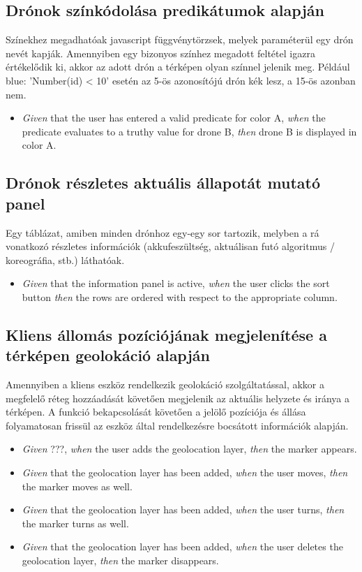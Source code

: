\subsection{Drónok színkódolása predikátumok alapján}

Színekhez megadhatóak javascript függvénytörzsek, melyek paraméterül egy drón nevét kapják.
Amennyiben egy bizonyos színhez megadott feltétel igazra értékelődik ki, akkor az adott drón a térképen olyan színnel jelenik meg.
Például blue: 'Number(id) < 10' esetén az 5-ös azonosítójú drón kék lesz, a 15-ös azonban nem.

\begin {itemize}
  \item \textit{Given} that the user has entered a valid predicate for color A, \textit{when} the predicate evaluates to a truthy value for drone B, \textit{then} drone B is displayed in color A.
\end {itemize}


\subsection{Drónok részletes aktuális állapotát mutató panel}

Egy táblázat, amiben minden drónhoz egy-egy sor tartozik, melyben a rá vonatkozó részletes információk (akkufeszültség, aktuálisan futó algoritmus / koreográfia, stb.) láthatóak.

\begin {itemize}
  \item \textit{Given} that the information panel is active, \textit{when} the user clicks the sort button \textit{then} the rows are ordered with respect to the appropriate column.
\end {itemize}


\subsection{Kliens állomás pozíciójának megjelenítése a térképen geolokáció alapján}

Amennyiben a kliens eszköz rendelkezik geolokáció szolgáltatással, akkor a megfelelő réteg hozzáadását követően megjelenik az aktuális helyzete és iránya a térképen.
A funkció bekapcsolását követően a jelölő pozíciója és állása folyamatosan frissül az eszköz által rendelkezésre bocsátott információk alapján.

\begin {itemize}
  \item \textit{Given} ???, \textit{when} the user adds the geolocation layer, \textit{then} the marker appears.
  \item \textit{Given} that the geolocation layer has been added, \textit{when} the user moves, \textit{then} the marker moves as well.
  \item \textit{Given} that the geolocation layer has been added, \textit{when} the user turns, \textit{then} the marker turns as well.
  \item \textit{Given} that the geolocation layer has been added, \textit{when} the user deletes the geolocation layer, \textit{then} the marker disappears.
\end {itemize}


